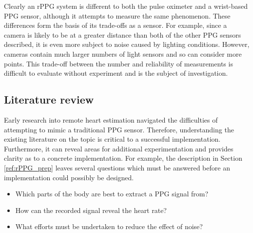 Clearly an rPPG system is different to both the pulse oximeter and a wrist-based PPG sensor, although it attempts to measure the same phenomenon.
These differences form the basis of its trade-offs as a sensor. For example, since a camera is likely to be at a greater distance than both of the other PPG sensors described, it is even more
subject to noise caused by lighting conditions. However, cameras contain much larger numbers of light sensors and so can consider more points. 
This trade-off between the number and reliability of measurements is difficult to evaluate without experiment and is the subject of investigation.

\subsection{Literature review}
\label{ref:literature_review}
Early research into remote heart estimation navigated the difficulties of attempting to mimic a traditional PPG sensor.
Therefore, understanding the existing literature on the topic is critical to a successful implementation. Furthermore, it can reveal areas for additional experimentation and provides clarity as to a concrete implementation.
For example, the description in Section \ref{ref:rPPG_prep} leaves several questions which must be answered before an implementation could possibly be designed.
\begin{itemize}
    \item Which parts of the body are best to extract a PPG signal from?
    \item How can the recorded signal reveal the heart rate?
    \item What efforts must be undertaken to reduce the effect of noise?
\end{itemize}
